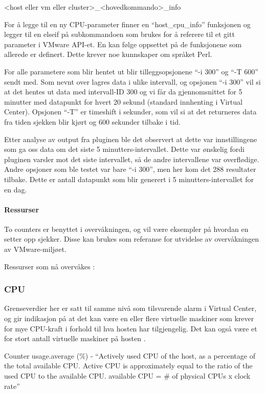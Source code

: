 <host eller vm eller cluster>\_<hovedkommando>\_info

For å legge til en ny CPU-parameter finner en ``host\_cpu\_info''  funksjonen og legger til en elseif på subkommandoen som brukes for å referere til et gitt parameter i VMware API-et. En kan følge oppsettet på de funksjonene som allerede er definert. Dette krever noe kunnskaper om språket Perl.

For alle parametere som blir hentet ut blir tilleggsopsjonene ``-i 300'' og ``-T 600'' sendt med. Som nevnt over lagres data i ulike intervall, og opsjonen ``-i 300''  vil si at det hentes ut data med intervall-ID 300 og vi får da gjennomsnittet for 5 minutter med datapunkt for hvert 20 sekund (standard innhenting i Virtual Center). Opsjonen ``-T''  er timeshift i sekunder, som vil si at det returneres data fra tiden sjekken blir kjørt og 600 sekunder tilbake i tid.

Etter analyse av output fra pluginen ble det observert at dette var innstillingene som ga oss data om det siste 5 minutters-intervallet. Dette var ønskelig fordi pluginen varsler mot det siste intervallet, så de andre intervallene var overflødige. Andre opsjoner som ble testet var bare ``-i 300'', men her kom det 288 resultater tilbake. Dette er antall datapunkt som blir generert i 5 minutters-intervallet for en dag. \cite{vmwareperfintervals}

\paragraph{Ressurser}
To counters er benyttet i overvåkningen, og vil være eksempler på hvordan en setter opp sjekker. Disse kan brukes som referanse for utvidelse av overvåkningen av VMware-miljøet.

Ressurser som nå overvåkes \cite{ciscovirtual} \cite{vmwaremonitoring}:

\subsubsection*{CPU}
Grenseverdier her er satt til samme nivå som tilsvarende alarm i Virtual Center, og gir indikasjon på at det kan være en eller flere virtuelle maskiner som krever for mye CPU-kraft i forhold til hva hosten har tilgjengelig. Det kan også være et for stort antall virtuelle maskiner på hosten \cite{vmwarecounters}.

Counter usage.average (\%) - ``Actively used CPU of the host, as a percentage of the total available CPU. Active CPU is approximately equal to the ratio of the used CPU to the available CPU. available CPU = \# of physical CPUs x clock rate''

